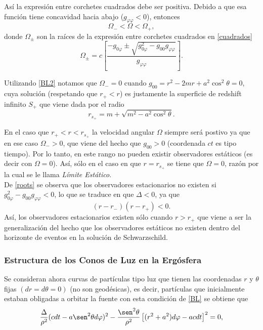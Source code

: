 As\'i la expresi\'on entre corchetes cuadrados debe ser positiva. Debido  a que esa funci\'on tiene concavidad hacia abajo ($g_{\varphi \varphi}<0$), entonces 
\begin{equation}
\Omega_{-}<\Omega <\Omega_{+},
\end{equation}
donde $\Omega_{\pm}$ son la ra\'ices de la expresi\'on entre corchetes cuadrados en \eqref{cuadrados}
\begin{equation}\label{roots}
\Omega_{\pm}= c\left[ \frac{-g_{0\varphi}\pm\sqrt{g_{0\varphi}^2-g_{00}g_{\varphi \varphi}}}{g_{\varphi \varphi}} \right].
\end{equation}

Utilizando \eqref{BL2} notamos que $\Omega_{-}=0$ cuando $g_{00}=r^2-2mr+a^2\cos^2 \theta=0$, cuya soluci\'on (respetando que $r_+<r$) es justamente la superficie de redshift infinito $S_{+}$ que viene dada por el radio
\begin{equation}
r_{s_+}=m+\sqrt{m^2-a^2\cos^2\theta}.
\end{equation}

En el caso que $r_+<r<r_{s_+}$ la velocidad angular $\Omega$ siempre ser\'a postivo ya que en ese caso $\Omega_{-}>0$, que viene del hecho que $g_{00}>0$ (coordenada $ct$ es tipo tiempo). Por lo tanto, en este rango no pueden existir observadores est\'aticos (es decir con $\Omega=0$). As\'i, s\'olo en el caso en que $r=r_{s_+}$ se tiene que $\Omega=0$, raz\'on por la cual se le llama \textit{L\'imite Est\'atico}.\\

De \eqref{roots} se observa que los observadores estacionarios no existen si $g_{0\varphi}^2-g_{00}g_{\varphi \varphi}<0$, lo que se traduce en que $\Delta <0$, ya que
\begin{equation}
(r-r_-)(r-r_+)<0.
\end{equation}
As\'i, los observadores estacionarios existen s\'olo cuando $r>r_+$ que viene a ser la generalizaci\'on del hecho que los observadores est\'aticos no existen dentro del horizonte de eventos en la soluci\'on de Schwarzschild.\\

\subsubsection{Estructura de los Conos de Luz en la Erg\'osfera}

Se consideran ahora curvas de part\'iculas tipo luz que tienen las coordenadas $r$ y $\theta$ fijas $(dr=d\theta=0)$ (no son geod\'esicas), es decir, part\'iculas que inicialmente estaban obligadas a orbitar la fuente con esta condici\'on de \eqref{BL} se obtiene que
\begin{equation}
\frac{\Delta}{\rho^2}(cdt-a\sen^2\theta d\varphi)^2-\frac{\sen^2\theta}{\rho^2}\left[(r^2+a^2)d\varphi-acdt \right]^2=0,
\end{equation}

